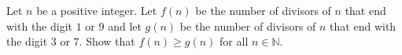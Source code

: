 Let $n$ be a positive integer. Let $f(n)$ be the number of divisors of $n$ that end with the
digit $1$ or $9$ and let $g(n)$ be the number of divisors of $n$ that end with the digit $3$ or $7$.
Show that $f(n) \geq g(n)$ for all $n \in \mathbb{N}$.
